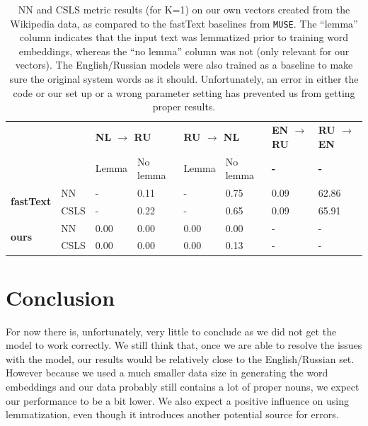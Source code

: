 \documentclass{article}
\begin{document}
\begin{table}[ht]
\centering
\label{table:results}
\begin{tabular}{|l|l|l|l|l|l|l|l|}
\hline
\multicolumn{2}{|l|}{\multirow{2}{*}{}}   & \multicolumn{2}{l|}{\textbf{NL $\rightarrow$ RU}} & \multicolumn{2}{l|}{\textbf{RU $\rightarrow$ NL}} & \textbf{EN $\rightarrow$ RU} & \textbf{RU $\rightarrow$ EN} \\ \cline{3-8} 
\multicolumn{2}{|l|}{}                    & Lemma         & No lemma    & Lemma & No lemma   & \textbf{-}   & \textbf{-}     \\ \hline
\multirow{2}{*}{\textbf{fastText}} & NN   & -             &   0.11      &  -    &  0.75      &    0.09      &    62.86       \\ \cline{2-8} 
                                   & CSLS & -             &   0.22      &  -    &  0.65      &    0.09      &    65.91       \\ \hline
\multirow{2}{*}{\textbf{ours}}     & NN   &  0.00         &  0.00       & 0.00  &  0.00      & -            & -              \\ \cline{2-8} 
                                   & CSLS &  0.00         &  0.00       & 0.00  &    0.13    & -            & -              \\ \hline
\end{tabular}
\caption{NN and CSLS metric results (for K=1) on our own vectors created from the Wikipedia data, as compared to the fastText baselines from \texttt{MUSE}. The ``lemma'' column indicates that the input text was lemmatized prior to training word embeddings, whereas the ``no lemma'' column was not (only relevant for our vectors). The English/Russian models were also trained as a baseline to make sure the original system words as it should. Unfortunately, an error in either the code or our set up or a wrong parameter setting has prevented us from getting proper results.}
\end{table}


\section{Conclusion}
For now there is, unfortunately, very little to conclude as we did not get the model to work correctly. We still think that, once we are able to resolve the issues with the model, our results would be relatively close to the English/Russian set. However because we used a much smaller data size in generating the word embeddings and our data probably still contains a lot of proper nouns, we expect our performance to be a bit lower. We also expect a positive influence on using lemmatization, even though it introduces another potential source for errors. 
\end{document}

